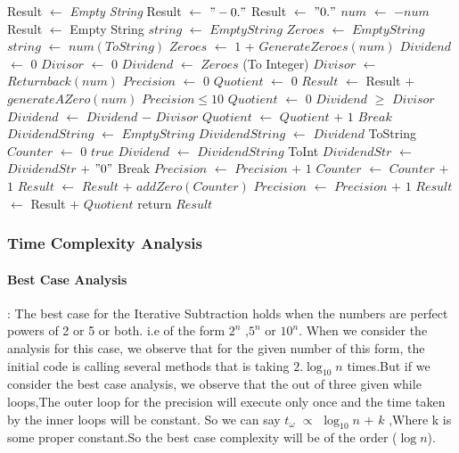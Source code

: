 \documentclass[twocolumn]{article}      %
\begin{document}
\begin{algorithm}
\begin{algorithmic}[1]
\State  Result $\gets$ \textit{Empty String}
\State Result $\gets$ $"-0."$
\EndIf
{}
\State Result $\gets$ $"0."$ 
\State $num$ $\gets$ $-num$
\EndIf
{}
\State Result $\gets$ Empty String
\EndIf
\State $string$  $\gets$ ${Empty String}$
\State $Zeroes$  $\gets$ ${Empty String}$
\State $string$ $\gets$  ${num(To String)}$
\State $Zeroes$ $\gets$ $1$ + ${GenerateZeroes(num)}$
\State $Dividend$ $\gets$ $0$
\State $Divisor$ $\gets$ $0$
\State $Dividend$ $\gets$ $Zeroes$ (To Integer)
\State $Divisor$ $\gets$ $Returnback(num)$
\State $Precision$ $\gets$ $0$
\State $Quotient$ $\gets$ $0$
\State $Result$ $\gets$ Result $+$ $generateAZero(num)$
\While ${Precision \leq 10}$  
\State $Quotient$ $\gets$ $0$
\While $Dividend$ $\geq$ $Divisor$
\State $Dividend$ $\gets$ $Dividend$ $-$ $Divisor$ 
\State $Quotient$ $\gets$ $Quotient$ $+$ $1$
\EndWhile
{}
\State $Break$
\EndIf
\State $DividendString$ $\gets$ $EmptyString$
\State $DividendString$ $\gets$ $Dividend$ ToString
\State $Counter$ $\gets$ $0$
\While $true$
\State $Dividend$ $\gets$ $DividendString$ ToInt
\State $DividendStr$ $\gets$ $DividendStr$ + $"0"$
\State Break
\EndIf
\State $Precision$ $\gets$ $Precision$ $+$ $1$
\State $Counter$ $\gets$ $Counter$ $+$ $1$
\EndWhile
\State $Result$ $\gets$ $Result$ $+$ $addZero(Counter)$
\State $Precision$ $\gets$ $Precision$ $+$ $1$
\State $Result$ $\gets$ Result $+$ $Quotient$ 
\EndWhile
\State return $Result$
\EndProcedure
\end{algorithmic}
\end{algorithm}
\subsubsection{Time Complexity Analysis}
\paragraph{Best Case Analysis} : The best case for the Iterative Subtraction holds when the numbers are  perfect powers of 2 or 5 or both. i.e of the form $2^n$ ,$5^n$ or $10^n$. When we consider the analysis for this case, we observe that for the given number of this form, the initial code is calling several methods that is taking $2.\log_{10} n$ times.But if we consider the best case analysis, we observe that the out of three given while loops,The outer loop for the precision will execute only once and the time taken by the inner loops will be constant.
So we can say 
${t_\omega}$ $\propto$ $\log_{10}n$ $+$ $k$ ,Where k is some proper constant.So the best case complexity will be of the order \Omega($\log n$).
\end{document}
